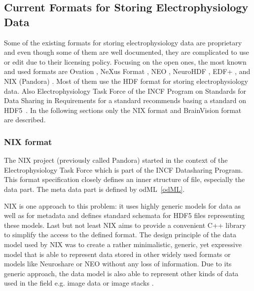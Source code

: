 \documentclass[conference]{IEEEtran}
\begin{document}
\subsection{Current Formats for Storing Electrophysiology Data}
Some of the existing formats for storing electrophysiology data are proprietary and even though some of them are well documented, they are complicated to use or edit due to their licensing policy. Focusing on the open ones, the most known and used formats are Ovation \cite{ovation}, NeXus Format \cite{nexus}, NEO \cite{neo}, NeuroHDF \cite{neurohdf}, EDF+ \cite{kemp2003}, and NIX (Pandora) \cite{pandora}. Most of them use the HDF format for storing electrophysiology data. Also Electrophysiology Task Force of the INCF Program on Standards for Data Sharing in Requirements for a standard recommends basing a standard on HDF5~\cite{requirements}. In the following sections only the NIX format and BrainVision format are described. 

\subsubsection{NIX format}
\label{nixsection}
The NIX project (previously called Pandora) started in the context of the Electrophysiology Task Force which is part of the INCF Datasharing Program. This format specification closely defines an inner structure of file, especially the data part. The meta data part is defined by odML~\ref{odML}. 

NIX is one approach to this problem: it uses highly generic models for data as well as for metadata and defines standard schemata for HDF5 files representing these models. Last but not least NIX aims to provide a convenient C++ library to simplify the access to the defined format. The design principle of the data model used by NIX was to create a rather minimalistic, generic, yet expressive model that is able to represent data stored in other widely used formats or models like Neuroshare or NEO without any loss of information. Due to its generic approach, the data model is also able to represent other kinds of data used in the field e.g. image data or image stacks \cite{pandora}.
\end{document}
